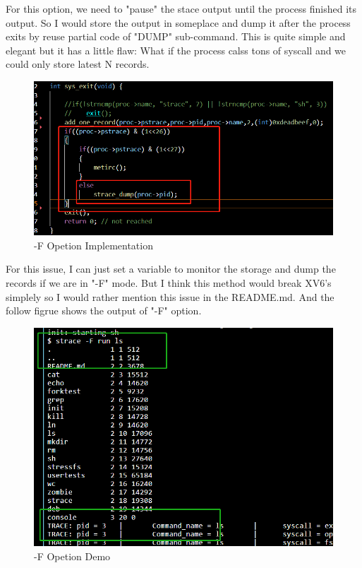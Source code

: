 \documentclass[11pt,oneside,a4paper]{article}
\begin{document}
For this option, we need to "pause" the stace output until the process finished its output.
So I would store the output in someplace and dump it after the process exits by reuse partial 
code of "DUMP" sub-command. This is quite simple and elegant but it has a little flaw: What if
the process calss tons of syscall and we could only store latest N records. 

\begin{figure}[H]
    \includegraphics[width=4.75in]{1-24.png}
    \centering
    \caption{-F Opetion Implementation}
\end{figure}

For this issue, I can just set a variable to monitor the storage and dump the records if 
we are in "-F" mode. But I think this method would break XV6's simplely so I would rather 
mention this issue in the README.md. And the follow figrue shows the output of "-F" option.

\begin{figure}[H]
    \includegraphics[width=4.75in]{1-25.png}
    \centering
    \caption{-F Opetion Demo}
\end{figure}
\end{document}
